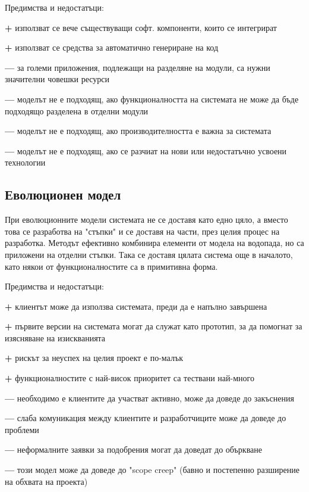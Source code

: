 \documentclass[fleqn,12pt]{article}
\begin{document}
Предимства и недостатъци:
\begin{description}
	\item \textbf{+} използват се вече съществуващи софт. компоненти, които се интегрират
	\item \textbf{+} използват се средства за автоматично генериране на код
	\item \textbf{---} за големи приложения, подлежащи на разделяне на модули, са нужни значителни човешки ресурси
	\item \textbf{---} моделът не е подходящ, ако функционалността на системата не може да бъде подходящо разделена в отделни модули
	\item \textbf{---} моделът не е подходящ, ако производителността е важна за системата
	\item \textbf{---} моделът не е подходящ, ако се разчиат на нови или недостатъчно усвоени технологии
\end{description}

\subsection{Еволюционен модел}
При еволюционните модели системата не се доставя като едно цяло, а вместо това се разработва на "стъпки" и се доставя на части, през целия процес на разработка. Методът ефективно комбинира елементи от модела на водопада, но са приложени на отделни стъпки. Така се доставя цялата система още в началото, като някои от функционалностите са в примитивна форма.

Предимства и недостатъци:
\begin{description}
	\item \textbf{+} клиентът може да използва системата, преди да е напълно завършена
	\item \textbf{+} първите версии на системата могат да служат като прототип, за да помогнат за изясняване на изискванията
	\item \textbf{+} рискът за неуспех на целия проект е по-малък
	\item \textbf{+} функционалностите с най-висок приоритет са тествани най-много
	\item \textbf{---} необходимо е клиентите да участват активно, може да доведе до закъснения
	\item \textbf{---} слаба комуникация между клиентите и разработчиците може да доведе до проблеми  
	\item \textbf{---} неформалните заявки за подобрения могат да доведат до объркване
	\item \textbf{---} този модел може да доведе до "scope creep" (бавно и постепенно разширение на обхвата на проекта)
\end{description}
\end{document}
